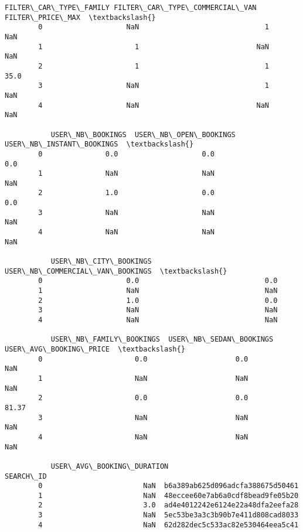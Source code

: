 \documentclass[11pt]{article}
\begin{document}
\begin{Verbatim}[commandchars=\\\{\}]
          FILTER\_CAR\_TYPE\_FAMILY FILTER\_CAR\_TYPE\_COMMERCIAL\_VAN  FILTER\_PRICE\_MAX  \textbackslash{}
        0                    NaN                              1               NaN   
        1                      1                            NaN               NaN   
        2                      1                              1              35.0   
        3                    NaN                              1               NaN   
        4                    NaN                            NaN               NaN   
        
           USER\_NB\_BOOKINGS  USER\_NB\_OPEN\_BOOKINGS  USER\_NB\_INSTANT\_BOOKINGS  \textbackslash{}
        0               0.0                    0.0                       0.0   
        1               NaN                    NaN                       NaN   
        2               1.0                    0.0                       0.0   
        3               NaN                    NaN                       NaN   
        4               NaN                    NaN                       NaN   
        
           USER\_NB\_CITY\_BOOKINGS  USER\_NB\_COMMERCIAL\_VAN\_BOOKINGS  \textbackslash{}
        0                    0.0                              0.0   
        1                    NaN                              NaN   
        2                    1.0                              0.0   
        3                    NaN                              NaN   
        4                    NaN                              NaN   
        
           USER\_NB\_FAMILY\_BOOKINGS  USER\_NB\_SEDAN\_BOOKINGS  USER\_AVG\_BOOKING\_PRICE  \textbackslash{}
        0                      0.0                     0.0                     NaN   
        1                      NaN                     NaN                     NaN   
        2                      0.0                     0.0                   81.37   
        3                      NaN                     NaN                     NaN   
        4                      NaN                     NaN                     NaN   
        
           USER\_AVG\_BOOKING\_DURATION                         SEARCH\_ID  
        0                        NaN  b6a389ab625d096adcfa388675d50461  
        1                        NaN  48eccee60e7ab6a0cdf8bead9fe05b20  
        2                        3.0  ad4e4012242e6124e22a48dfa2eefa28  
        3                        NaN  5ec53be3a3c3b90b7e411d808cad8033  
        4                        NaN  62d282dec5c533ac82e530464eea5c41  
\end{Verbatim}
            
\end{document}
